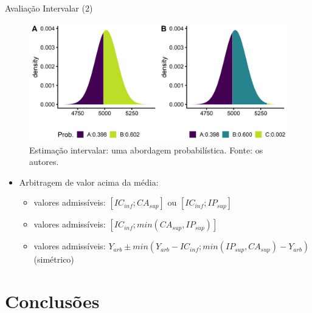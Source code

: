\documentclass[9pt,ignorenonframetext,aspectratio=169]{beamer}
\providecommand{\tightlist}{%
  \setlength{\itemsep}{0pt}\setlength{\parskip}{0pt}}
\begin{document}
\begin{frame}{Avaliação Intervalar (2)}
\protect\hypertarget{avaliauxe7uxe3o-intervalar-2}{}

\begin{figure}

{\centering \includegraphics[width=0.7\linewidth]{../../images/dists-1} 

}

\caption{Estimação intervalar: uma abordagem probabilística. Fonte: os autores.}\label{fig:unnamed-chunk-13}
\end{figure}

\begin{itemize}[<+->]
\tightlist
\item
  Arbitragem de valor acima da média:

  \begin{itemize}[<+->]
  \tightlist
  \item
    valores admissíveis: \([IC_{inf}; CA_{sup}]\) ou
    \([IC_{inf}; IP_{sup}]\)
  \item
    valores admissíveis: \([IC_{inf}; min(CA_{sup}, IP_{sup})]\)
  \item
    valores admissíveis:
    \(Y_{arb} \pm min(Y_{arb} - IC_{inf}; min(IP_{sup}, CA_{sup}) - Y_{arb})\)
    (simétrico)
  \end{itemize}
\end{itemize}

\end{frame}

\hypertarget{conclusuxf5es}{%
\section{Conclusões}\label{conclusuxf5es}}
\end{document}

